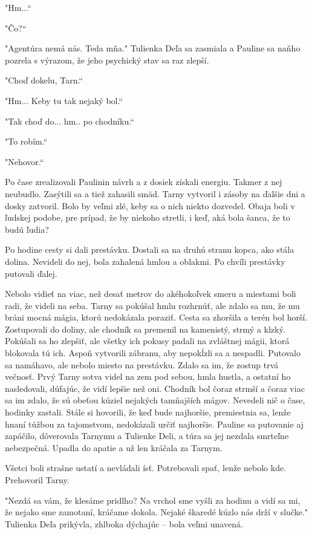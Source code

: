 \documentclass{book}
\begin{document}
"$ $Hm...“

"$ $Čo?“

"$ $Agentúra nemá nás. Teda mňa."$ $ Tulienka Deľa sa zasmiala a Pauline sa naňho pozrela s výrazom, že jeho psychický stav sa raz zlepší.

"$ $Choď dokelu, Tarn.“

"$ $Hm... Keby tu tak nejaký bol.“

"$ $Tak choď do... hm.. po chodníku.“

"$ $To robím.“

"$ $Nehovor.“

Po čase zrealizovali Paulinin návrh a z dosiek získali energiu. Takmer z nej neubudlo. Zasýtili sa a tiež zahasili smäd. Tarny vytvoril i zásoby na ďalšie dni a dosky zatvoril. Bolo by veľmi zlé, keby sa o nich niekto dozvedel. Obaja boli v ľudskej podobe, pre prípad, že by niekoho stretli, i keď, aká bola šanca, že to budú ľudia?

Po hodine cesty si dali prestávku. Dostali sa na druhú stranu kopca, ako stála dolina. Nevideli do nej, bola zahalená hmlou a oblakmi. Po chvíli prestávky putovali ďalej.

Nebolo vidieť na viac, než desať metrov do akéhokoľvek smeru a miestami boli radi, že videli na seba. Tarny sa pokúšal hmlu rozhrnúť, ale zdalo sa mu, že mu bráni mocná mágia, ktorú nedokázala poraziť. Cesta sa zhoršila a terén bol horší. Zostupovali do doliny, ale chodník sa premenil na kamenistý, strmý a klzký. Pokúšali sa ho zlepšiť, ale všetky ich pokusy padali na zvláštnej mágii, ktorá blokovala tú ich. Aspoň vytvorili zábranu, aby nepokĺzli sa a nespadli. Putovalo sa namáhavo, ale nebolo miesto na prestávku. Zdalo sa im, že zostup trvá večnosť. Prvý Tarny sotva videl na zem pod sebou, hmla hustla, a ostatní ho nasledovali, dúfajúc, že vidí lepšie než oni. Chodník bol čoraz strmší a čoraz viac sa im zdalo, že sú obeťou kúziel nejakých tamňajších mágov. Nevedeli nič o čase, hodinky zastali. Stále si hovorili, že keď bude najhoršie, premiestnia sa, lenže hnaní túžbou za tajomstvom, nedokázali určiť najhoršie. Pauline sa putovanie aj zapáčilo, dôverovala Tarnymu a Tulienke Deli, a túra sa jej nezdala smrteľne nebezpečná. Upadla do apatie a už len kráčala za Tarnym.

Všetci boli strašne ustatí a nevládali ísť. Potrebovali spať, lenže nebolo kde. Prehovoril Tarny.

"$ $Nezdá sa vám, že klesáme pridlho? Na vrchol sme vyšli za hodinu a vidí sa mi, že nejako sme zamotaní, kráčame dokola. Nejaké škaredé kúzlo nás drží v slučke."$ $ Tulienka Deľa prikývla, zhlboka dýchajúc – bola veľmi unavená.
\end{document}
